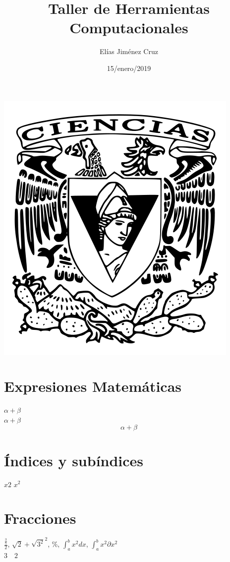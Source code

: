 \documentclass{article}
\title{\Huge Taller de Herramientas Computacionales}
\author{Elías Jiménez Cruz}
\date{15/enero/2019}
\begin{document}
	\maketitle
	\begin{center}
		\includegraphics[scale=0.40]{EscudoFC.png}
	\end{center}
	\newpage
	\section*{Expresiones Matemáticas} %
	$\alpha + \beta$ \\
	\(\alpha +\beta\) \\
	\[\alpha + \beta\]
	\section*{Índices y subíndices}
	$x {2}$
	$x^{2}$
	\section*{Fracciones}
	$\frac{\frac{3}{5}}{2}$, 
	$\sqrt{2} + \sqrt{3^2}^2$, 
	\%, %
	$\int_{a}^{b} x^2 dx$, 
	$\int_{a}^{b} x^2 \partial x^2$\\
	\begin{equation}
		\label{key}
	\end{equation}
	$3 \quad 2$
\end{document}
